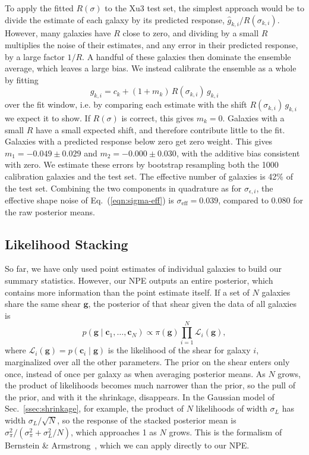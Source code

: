 To apply the fitted $R(\sigma)$ to the Xu3 test set, the simplest approach would be to divide the estimate of each galaxy by its predicted response, $\hat{g}_{k,i}/R(\sigma_{k,i})$. However, many galaxies have $R$ close to zero, and dividing by a small $R$ multiplies the noise of their estimates, and any error in their predicted response, by a large factor $1/R$. A handful of these galaxies then dominate the ensemble average, which leaves a large bias. We instead calibrate the ensemble as a whole by fitting
\begin{equation}
\label{eqn:ensemble-calibration}
    \hat{g}_{k,i} = c_k + (1+m_k)\, R(\sigma_{k,i})\, g_{k,i}
\end{equation}
over the fit window, i.e. by comparing each estimate with the shift $R(\sigma_{k,i})\,g_{k,i}$ we expect it to show. If $R(\sigma)$ is correct, this gives $m_k = 0$. Galaxies with a small $R$ have a small expected shift, and therefore contribute little to the fit. Galaxies with a predicted response below zero get zero weight. This gives $m_1 = -0.049 \pm 0.029$ and $m_2 = -0.000 \pm 0.030$, with the additive bias consistent with zero. We estimate these errors by bootstrap resampling both the 1000 calibration galaxies and the test set. The effective number of galaxies is 42\% of the test set. Combining the two components in quadrature as for $\sigma_{\epsilon,i}$, the effective shape noise of Eq.~(\ref{eqn:sigma-eff}) is $\sigma_\mathrm{eff} = 0.039$, compared to 0.080 for the raw posterior means.

\subsection{Likelihood Stacking}
\label{ssec:stacking}

So far, we have only used point estimates of individual galaxies to build our summary statistics. However, our NPE outputs an entire posterior, which contains more information than the point estimate itself. If a set of $N$ galaxies share the same shear $\mathbf{g}$, the posterior of that shear given the data of all galaxies is
\begin{equation}
\label{eqn:stack}
    p(\mathbf{g} \mid \mathbf{c}_1, \dots, \mathbf{c}_N) \propto \pi(\mathbf{g}) \prod_{i=1}^{N} \mathcal{L}_i(\mathbf{g}),
\end{equation}
where $\mathcal{L}_i(\mathbf{g}) = p(\mathbf{c}_i \mid \mathbf{g})$ is the likelihood of the shear for galaxy $i$, marginalized over all the other parameters. The prior on the shear enters only once, instead of once per galaxy as when averaging posterior means. As $N$ grows, the product of likelihoods becomes much narrower than the prior, so the pull of the prior, and with it the shrinkage, disappears. In the Gaussian model of Sec.~\ref{ssec:shrinkage}, for example, the product of $N$ likelihoods of width $\sigma_L$ has width $\sigma_L/\sqrt{N}$, so the response of the stacked posterior mean is $\sigma_\pi^2/(\sigma_\pi^2 + \sigma_L^2/N)$, which approaches 1 as $N$ grows. This is the formalism of Bernstein \& Armstrong~\citep{BA14}, which we can apply directly to our NPE.

